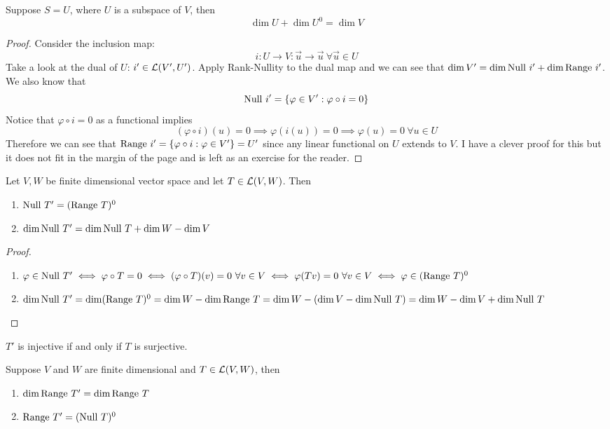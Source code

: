 \begin{theorem}
    Suppose $S = U$, where $U$ is a subspace of $V$, then 
    \[ \dim U + \dim U^0 = \dim V\]
\end{theorem}
\begin{proof}
    Consider the inclusion map: \[i : U \to V : \vec u \to \vec u \ \forall \vec u \in U\] 
    Take  a look at the dual of $U$: $i' \in \mathcal L(V', U')$. Apply Rank-Nullity to the dual map and we can see that $\dim V' = \dim \text{Null } i' + \dim \text{Range } i'$. We also know that \[\text{Null } i' = \left\{ \varphi \in V' : \varphi \circ i = 0 \right\}\] Notice that $\varphi \circ i = 0$ as a functional implies \[(\varphi \circ i) (u) = 0 \implies \varphi(i(u)) = 0 \implies \varphi(u) = 0 \ \forall u \in U \]
    Therefore we can see that $\text{Range } i' = \left\{ \varphi \circ i : \varphi \in V' \right\} = U'$ since any linear functional on $U$ extends to $V$. I have a clever proof for this but it does not fit in the margin of the page and is left as an exercise for the reader. 
\end{proof}
\begin{theorem}
    Let $V,W$ be finite dimensional vector space and let $T \in \mathcal L(V,W)$. Then 
    \begin{enumerate}[label = (\alph*)]
        \item $\text{Null } T' = (\text{Range } T)^0$
        \item $\dim \text{Null } T' = \dim \text{Null } T + \dim W - \dim V$
    \end{enumerate}
\end{theorem}
\begin{proof} $ $
    \begin{enumerate}[label = (\alph*)]
        \item $\varphi \in \text{Null } T' \iff \varphi \circ T = 0 \iff (\varphi \circ T)(v) = 0 \ \forall v \in V \iff \varphi(Tv) = 0 \ \forall v \in V \\ \iff \varphi \in (\text{Range } T)^0$
        \item $\dim \text{Null } T' = \dim (\text{Range } T)^0 = \dim W - \dim \text{Range } T = \dim W - (\dim V - \dim \text{Null } T) = \dim W - \dim V + \dim \text{Null } T$
    \end{enumerate}
\end{proof}
\begin{corollary}
    $T'$ is injective if and only if $T$ is surjective.
\end{corollary}
\begin{theorem}
    Suppose $V$ and $W$ are finite dimensional and $T \in \mathcal L(V,W)$, then 
    \begin{enumerate}[label = (\alph*)]
        \item $\dim \text{Range } T' = \dim \text{Range } T$
        \item $\text{Range } T' = (\text{Null } T)^0$
    \end{enumerate}
\end{theorem}
